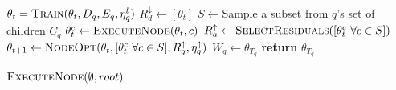 \begin{algorithm}[H]
\begin{onehalfspace}
\begin{algorithmic}[1]
             \label{alg:B-HFL:line:6}
            \State $\theta_t = \Call{Train}{\theta_{t},D_q,  E_q, \eta^l_q}$  \label{alg:B-HFL:line:7}
              \label{alg:B-HFL:line:8}
            \State $ R^\downarrow_d \gets [\theta_t]$ \label{alg:B-HFL:line:9}
            \EndFor
            \State $S \gets $Sample a subset from $q$'s set of children $C_q$ \label{alg:B-HFL:line:10}
             \label{alg:B-HFL:line:11}
            \State $\theta_t^c \gets \Call{ExecuteNode}{\theta_t, c} $  \label{alg:B-HFL:line:12}
            \EndFor
             \label{alg:B-HFL:line:13}
            \State $ R^\uparrow_a \gets \Call{SelectResiduals}{[\theta^c_t \,\, \forall c \in S]}$ \label{alg:B-HFL:line:14}
            \EndFor
            \State $\theta_{t+1} \gets \Call{NodeOpt}{\theta_t, [\theta^c_t \,\, \forall c \in S], R^\uparrow_q, \eta^{\uparrow}_q}  $  \label{alg:B-HFL:line:15}
            \EndFor
            \State $W_q \gets \theta_{T_q}$  \label{alg:B-HFL:line:16}
            \State \textbf{return} $\theta_{T_q}$ \label{alg:B-HFL:line:17}
            \EndProcedure

            \State $\Call{ExecuteNode}{\emptyset, root}$
        \end{algorithmic}
    \end{onehalfspace}
\end{algorithm}

